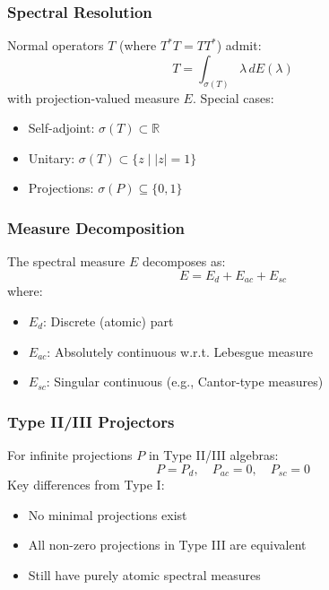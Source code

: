 \documentclass{article}
\begin{document}
\subsubsection*{Spectral Resolution}

Normal operators $T $ (where $T^*T = TT^* $) admit: 
\begin{equation*}
T = \int_{\sigma(T)} \lambda \, dE(\lambda) 
\end{equation*}
with projection-valued measure $E $. Special cases:

\begin{itemize}
\item Self-adjoint: $\sigma(T) \subset \mathbb{R} $

\item Unitary: $\sigma(T) \subset \{z \mid |z|=1\} $

\item Projections: $\sigma(P) \subseteq \{0,1\} $
\end{itemize}

\subsubsection*{Measure Decomposition}

The spectral measure $E $ decomposes as: 
\begin{equation*}
E = E_d + E_{ac} + E_{sc} 
\end{equation*}
where:

\begin{itemize}
\item $E_d $: Discrete (atomic) part

\item $E_{ac} $: Absolutely continuous w.r.t. Lebesgue measure

\item $E_{sc} $: Singular continuous (e.g., Cantor-type measures)
\end{itemize}

\subsubsection*{Type II/III Projectors}

For infinite projections $P $ in Type II/III algebras: 
\begin{equation*}
P = P_d, \quad P_{ac} = 0, \quad P_{sc} = 0 
\end{equation*}
Key differences from Type I:

\begin{itemize}
\item No minimal projections exist

\item All non-zero projections in Type III are equivalent

\item Still have purely atomic spectral measures
\end{itemize}
\end{document}
